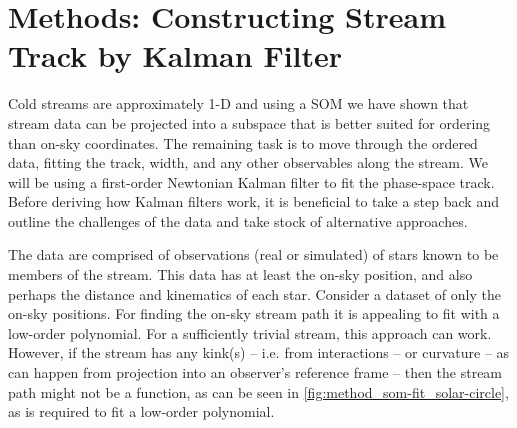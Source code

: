 \documentclass[fleqn,usenatbib]{mnras}
\begin{document}







\section{Methods: Constructing Stream Track by Kalman Filter}
\label{sec:kalman_filter}

  Cold streams are approximately 1-D and using a SOM we have shown that stream
  data can be projected into a subspace that is better suited for ordering than
  on-sky coordinates. The remaining task is to move through the ordered data,
  fitting the track, width, and any other observables along the stream. We will
  be using a first-order Newtonian Kalman filter to fit the phase-space track.
  Before deriving how Kalman filters work, it is beneficial to take a step back
  and outline the challenges of the data and take stock of alternative
  approaches.


    The data are comprised of observations (real or simulated) of stars known to
    be members of the stream. This data has at least the on-sky position, and
    also perhaps the distance and kinematics of each star. Consider a dataset of
    only the on-sky positions. For finding the on-sky stream path it is
    appealing to fit with a low-order polynomial. For a sufficiently trivial
    stream, this approach can work. However, if the stream has any kink(s) --
    i.e. from interactions -- or curvature -- as can happen from projection into
    an observer's reference frame -- then the stream path might not be a
    function, as can be seen in \autoref{fig:method_som-fit_solar-circle}, as is
    required to fit a low-order polynomial.    
\end{document}
